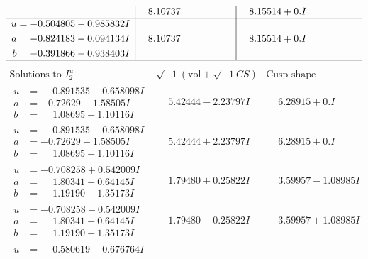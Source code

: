 \documentclass[1p]{elsarticle_modified}
\theoremstyle{definition}
\newcommand{\I}{\sqrt{-1}}
\begin{document}
$$\begin{array}{c|c|c}
 & \phantom{-}8.10737\phantom{ +0.000000I} & \phantom{-}8.15514 + 0. I\phantom{ +0.000000I} \\ \hline\begin{aligned}
u &= -0.504805 - 0.985832 I \\
a &= -0.824183 - 0.094134 I \\
b &= -0.391866 - 0.938403 I\end{aligned}
 & \phantom{-}8.10737\phantom{ +0.000000I} & \phantom{-}8.15514 + 0. I\phantom{ +0.000000I}\\
 \hline 
 \end{array}$$\newpage$$\begin{array}{c|c|c}  
\text{Solutions to }I^u_{2}& \I (\text{vol} + \sqrt{-1}CS) & \text{Cusp shape}\\
 \hline 
\begin{aligned}
u &= \phantom{-}0.891535 + 0.658098 I \\
a &= -0.72629 - 1.58505 I \\
b &= \phantom{-}1.08695 - 1.10116 I\end{aligned}
 & \phantom{-}5.42444 - 2.23797 I & \phantom{-}6.28915 + 0. I\phantom{ +0.000000I} \\ \hline\begin{aligned}
u &= \phantom{-}0.891535 - 0.658098 I \\
a &= -0.72629 + 1.58505 I \\
b &= \phantom{-}1.08695 + 1.10116 I\end{aligned}
 & \phantom{-}5.42444 + 2.23797 I & \phantom{-}6.28915 + 0. I\phantom{ +0.000000I} \\ \hline\begin{aligned}
u &= -0.708258 + 0.542009 I \\
a &= \phantom{-}1.80341 - 0.64145 I \\
b &= \phantom{-}1.19190 - 1.35173 I\end{aligned}
 & \phantom{-}1.79480 + 0.25822 I & \phantom{-}3.59957 - 1.08985 I \\ \hline\begin{aligned}
u &= -0.708258 - 0.542009 I \\
a &= \phantom{-}1.80341 + 0.64145 I \\
b &= \phantom{-}1.19190 + 1.35173 I\end{aligned}
 & \phantom{-}1.79480 - 0.25822 I & \phantom{-}3.59957 + 1.08985 I \\ \hline\begin{aligned}
u &= \phantom{-}0.580619 + 0.676764 I \\

\end{aligned}
\end{array}$$
\end{document}
